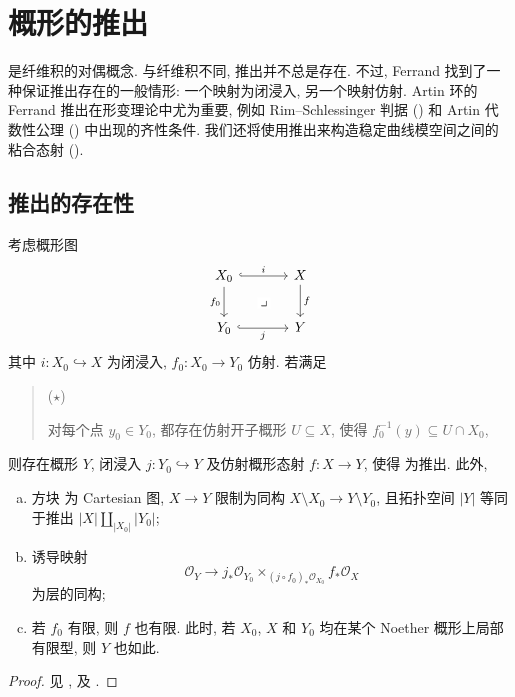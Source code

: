 \begingroup
\raggedbottom
\setlength{\emergencystretch}{2em}
\section{概形的推出}\label{src:B.4}
 是纤维积的对偶概念. 与纤维积不同, 推出并不总是存在. 不过, Ferrand 找到了一种保证推出存在的一般情形: 一个映射为闭浸入, 另一个映射仿射. Artin 环的 Ferrand 推出在形变理论中尤为重要, 例如 Rim--Schlessinger 判据 () 和 Artin 代数性公理 () 中出现的齐性条件. 我们还将使用推出来构造稳定曲线模空间之间的粘合态射 ().

\subsection{推出的存在性}\label{src:B.4.1-subsection}
\begin{theorem}[Ferrand 推出]\label{src:B.4.1}
考虑概形图
\begin{equation}\label{src:B.4.2}
\begin{tikzcd}[column sep=3.5em,row sep=2.2em]
X_0\arrow[r,hook,"i"]\arrow[d,"f_0"']\arrow[dr,phantom,"\lrcorner" description]&X\arrow[d,"f"]\\
Y_0\arrow[r,hook,"j"']&Y
\end{tikzcd}
\end{equation}
其中 $i:X_0\hookrightarrow X$ 为闭浸入, $f_0:X_0\to Y_0$ 仿射. 若满足
\begin{quote}
\hypertarget{pushout-affine-neighborhood}{($\star$)} 对每个点 $y_0\in Y_0$, 都存在仿射开子概形 $U\subseteq X$, 使得 $f_0^{-1}(y)\subseteq U\cap X_0$,
\end{quote}
则存在概形 $Y$, 闭浸入 $j:Y_0\hookrightarrow Y$ 及仿射概形态射 $f:X\to Y$, 使得  为推出. 此外,
\begin{enumerate}[(a)]
\item 方块  为 Cartesian 图, $X\to Y$ 限制为同构 $X\setminus X_0\to Y\setminus Y_0$, 且拓扑空间 $|Y|$ 等同于推出 $|X|\amalg_{|X_0|}|Y_0|$;
\item 诱导映射
\[
\mathcal O_Y\longrightarrow
j_*\mathcal O_{Y_0}\times_{(j\circ f_0)_*\mathcal O_{X_0}}f_*\mathcal O_X
\]
为层的同构;
\item 若 $f_0$ 有限, 则 $f$ 也有限. 此时, 若 $X_0$, $X$ 和 $Y_0$ 均在某个 Noether 概形上局部有限型, 则 $Y$ 也如此.
\end{enumerate}
\end{theorem}
\begin{proof}
见 \cite[定理 $5.4$ 及 $7.1$]{Fer03}, \cite[定理 $6.1$]{Art70} 及 \cite[Tag 0ECH]{SP}.
\end{proof}
